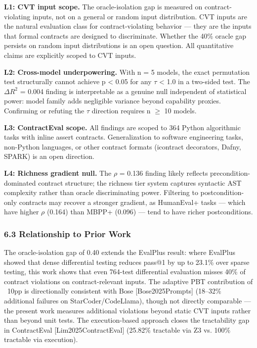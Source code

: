 \textbf{L1: CVT input scope.} The oracle-isolation gap is measured on contract-violating inputs, not on a general or random input distribution. CVT inputs are the natural evaluation class for contract-violating behavior --- they are the inputs that formal contracts are designed to discriminate. Whether the 40\% oracle gap persists on random input distributions is an open question. All quantitative claims are explicitly scoped to CVT inputs.

\textbf{L2: Cross-model underpowering.} With n = 5 models, the exact permutation test structurally cannot achieve p < 0.05 for any $\tau$ < 1.0 in a two-sided test. The $\Delta R^2$ = 0.004 finding is interpretable as a genuine null independent of statistical power: model family adds negligible variance beyond capability proxies. Confirming or refuting the $\tau$ direction requires n $\geq$ 10 models.

\textbf{L3: ContractEval scope.} All findings are scoped to 364 Python algorithmic tasks with inline assert contracts. Generalization to software engineering tasks, non-Python languages, or other contract formats (icontract decorators, Dafny, SPARK) is an open direction.

\textbf{L4: Richness gradient null.} The $\rho$ = 0.136 finding likely reflects precondition-dominated contract structure; the richness tier system captures syntactic AST complexity rather than oracle discriminating power. Filtering to postcondition-only contracts may recover a stronger gradient, as HumanEval+ tasks --- which have higher $\rho$ (0.164) than MBPP+ (0.096) --- tend to have richer postconditions.

\subsubsection{6.3 Relationship to Prior Work}

The oracle-isolation gap of 0.40 extends the EvalPlus result: where EvalPlus showed that dense differential testing reduces pass@1 by up to 23.1\% over sparse testing, this work shows that even 764-test differential evaluation misses 40\% of contract violations on contract-relevant inputs. The adaptive PBT contribution of ~10pp is directionally consistent with Bose [Bose2025Prompts] (18--32\% additional failures on StarCoder/CodeLlama), though not directly comparable --- the present work measures additional violations beyond static CVT inputs rather than beyond unit tests. The execution-based approach closes the tractability gap in ContractEval [Lim2025ContractEval] (25.82\% tractable via Z3 vs. 100\% tractable via execution).

